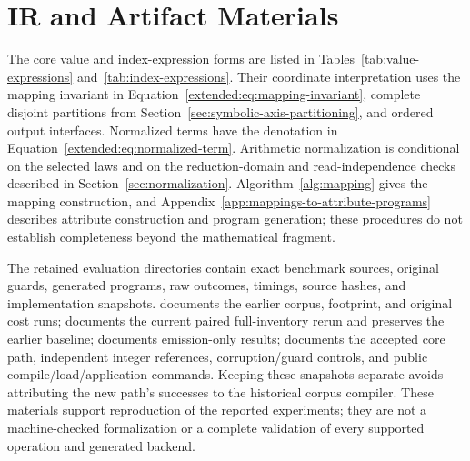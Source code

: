 \FloatBarrier
\section{IR and Artifact Materials}
\label{sec:artifact}
The core value and index-expression forms are listed in
Tables~\ref{tab:value-expressions} and~\ref{tab:index-expressions}. Their
coordinate interpretation uses the mapping invariant in
Equation~\eqref{extended:eq:mapping-invariant}, complete disjoint partitions from
Section~\ref{sec:symbolic-axis-partitioning}, and ordered output interfaces. Normalized
terms have the denotation in Equation~\eqref{extended:eq:normalized-term}. Arithmetic
normalization is conditional on the selected laws and on the reduction-domain
and read-independence checks described in Section~\ref{sec:normalization}.
Algorithm~\ref{alg:mapping} gives the mapping construction, and
Appendix~\ref{app:mappings-to-attribute-programs} describes attribute construction and program
generation; these procedures do not establish completeness beyond the
mathematical fragment.

The retained evaluation directories contain exact benchmark sources,
original guards, generated programs, raw outcomes, timings, source hashes,
and implementation snapshots.  documents
the earlier corpus, footprint, and original cost runs;
 documents the current paired
full-inventory rerun and preserves the earlier baseline;
 documents emission-only results;
 documents the accepted core path,
independent integer references, corruption/guard controls, and public
compile/load/application commands. Keeping these snapshots separate avoids
attributing the new path's successes to the historical corpus compiler.
These materials support reproduction of the reported experiments; they
are not a machine-checked formalization or a complete validation of every
supported operation and generated backend.
